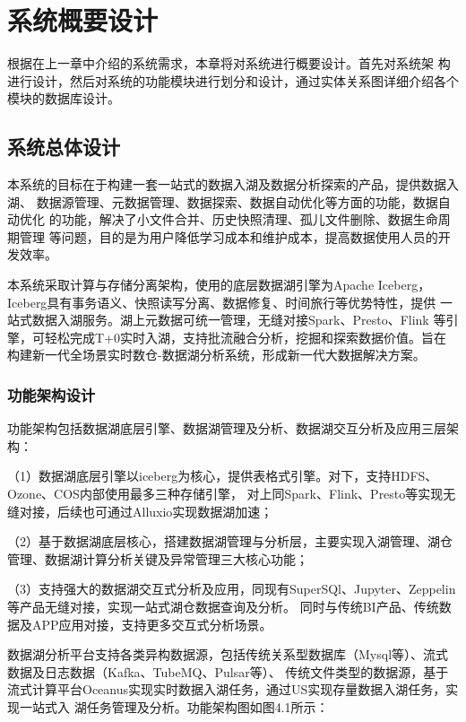 
\chapter{系统概要设计}

根据在上一章中介绍的系统需求，本章将对系统进行概要设计。首先对系统架
构进行设计，然后对系统的功能模块进行划分和设计，通过实体关系图详细介绍各个模块的数据库设计。

\section{系统总体设计}

本系统的目标在于构建一套一站式的数据入湖及数据分析探索的产品，提供数据入湖、
数据源管理、元数据管理、数据探索、数据自动优化等方面的功能，数据自动优化
的功能，解决了小文件合并、历史快照清理、孤儿文件删除、数据生命周期管理
等问题，目的是为用户降低学习成本和维护成本，提高数据使用人员的开发效率。

本系统采取计算与存储分离架构，使用的底层数据湖引擎为Apache Iceberg，
Iceberg具有事务语义、快照读写分离、数据修复、时间旅行等优势特性，提供
一站式数据入湖服务。湖上元数据可统一管理，无缝对接Spark、Presto、Flink
等引擎，可轻松完成T+0实时入湖，支持批流融合分析，挖掘和探索数据价值。旨在
构建新一代全场景实时数仓-数据湖分析系统，形成新一代大数据解决方案。

\subsection{功能架构设计}

功能架构包括数据湖底层引擎、数据湖管理及分析、数据湖交互分析及应用三层架构：

（1）数据湖底层引擎以iceberg为核心，提供表格式引擎。对下，支持HDFS、Ozone、COS内部使用最多三种存储引擎，
对上同Spark、Flink、Presto等实现无缝对接，后续也可通过Alluxio实现数据湖加速；

（2）基于数据湖底层核心，搭建数据湖管理与分析层，主要实现入湖管理、湖仓管理、数据湖计算分析关键及异常管理三大核心功能；

（3）支持强大的数据湖交互式分析及应用，同现有SuperSQl、Jupyter、Zeppelin等产品无缝对接，实现一站式湖仓数据查询及分析。
同时与传统BI产品、传统数据及APP应用对接，支持更多交互式分析场景。

数据湖分析平台支持各类异构数据源，包括传统关系型数据库（Mysql等）、流式数据及日志数据（Kafka、TubeMQ、Pulsar等）、
传统文件类型的数据源，基于流式计算平台Oceanus实现实时数据入湖任务，通过US实现存量数据入湖任务，实现一站式入
湖任务管理及分析。功能架构图如图4.1所示：


